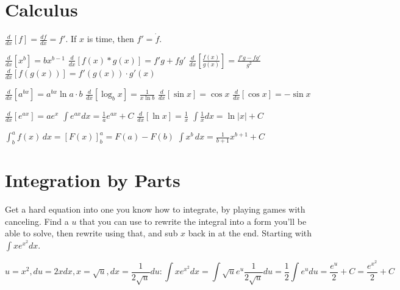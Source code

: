 \section{Calculus}

\newcommand{\DERIVATIVE}{\frac{d}{dx}}

$ \DERIVATIVE[f] = \frac{df}{dx} = f' $. If $x$ is time, then $ f' =
\dot{f} $.

\vspace{1em}

$ \DERIVATIVE[x^b] = bx^{b-1} $
\hspace{5ex}
$ \DERIVATIVE[f(x) * g(x)] = f'g + fg' $
\hspace{5ex}
$ \DERIVATIVE[\frac{f(x)}{g(x)}] = \frac{f'g - fg'}{g^2} $
\hspace{5ex}
$ \DERIVATIVE[f(g(x))] = f'(g(x)) \cdot g'(x) $

\vspace{1em}

$ \DERIVATIVE[a^{bx}] = a^{bx}\ln{a} \cdot b $
\hspace{5ex}
$ \DERIVATIVE[\log_b{x}] = \frac{1}{x\ln{b}} $
\hspace{5ex}
$ \DERIVATIVE[\sin{x}] = \cos{x} $
\hspace{5ex}
$ \DERIVATIVE[\cos{x}] = -\sin{x} $

\vspace{1em}

$ \DERIVATIVE[e^{ax}] = ae^{x} $
\hspace{5ex}
$ \int e^{ax}dx = \frac{1}{a}e^{ax} + C $
\hspace{5ex}
$ \DERIVATIVE[\ln x] = \frac{1}{x} $
\hspace{5ex}
$ \int\frac{1}{x}dx = \ln|x| + C $
\vspace{1em}

$ \int_b^a f(x)\,dx = [F(x)]_b^a = F(a) - F(b)$
\hspace{5ex}
$ \int x^b\,dx = \frac{1}{b+1}x^{b+1} + C $
\hspace{5ex}


\section{Integration by Parts}

Get a hard equation into one you know how to integrate, by playing
games with canceling. Find a $u$ that you can use to rewrite the
integral into a form you'll be able to solve, then rewrite using that,
and sub $x$ back in at the end. Starting with $\int xe^{x^2}dx$.

\vspace{-2em}

\[ u = x^2, du = 2xdx, x = \sqrt{u}, dx = \frac{1}{2\sqrt{u}}du :
\int xe^{x^2}dx = \int \sqrt{u}e^u\frac{1}{2\sqrt{u}}du =
\frac{1}{2}\int e^udu = \frac{e^u}{2} + C = \frac{e^{x^2}}{2} + C \]
